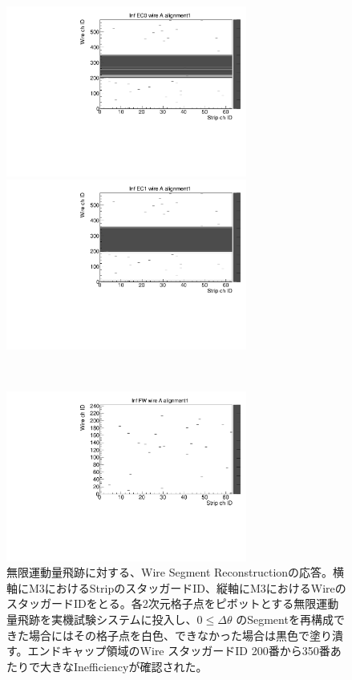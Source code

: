 \begin{figure}
    \begin{minipage}[b]{.5\linewidth}
        \centering
        \includegraphics[height=5.6cm]{fig/Test/B_InfEC0_wire.pdf}
    \end{minipage}
    \begin{minipage}[b]{.5\linewidth}
        \centering
        \includegraphics[height=5.6cm]{fig/Test/B_InfEC1_wire.pdf}
    \end{minipage}\\
    \begin{minipage}[b]{\linewidth}
        \centering
        \includegraphics[height=5.6cm]{fig/Test/B_InfFW_wire.pdf}
    \end{minipage}
    \caption[無限運動量飛跡に対する、Wire Segment Reconstructionの応答]{無限運動量飛跡に対する、Wire Segment Reconstructionの応答。横軸にM3におけるStripのスタッガードID、縦軸にM3におけるWireのスタッガードIDをとる。各2次元格子点をピボットとする無限運動量飛跡を実機試験システムに投入し、$0 \leq \Delta\theta$ のSegmentを再構成できた場合にはその格子点を白色、できなかった場合は黒色で塗り潰す。エンドキャップ領域のWire スタッガードID 200番から350番あたりで大きなInefficiencyが確認された。}
    \label{Inf_B_Wire}
\end{figure}


